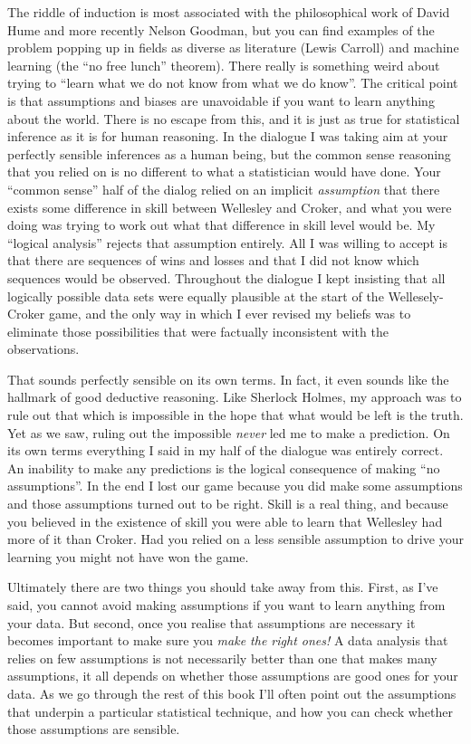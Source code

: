 The riddle of induction is most associated with the philosophical work of David Hume and more recently Nelson Goodman, but you can find examples of the problem popping up in fields as diverse as literature (Lewis Carroll) and machine learning (the ``no free lunch'' theorem). There really is something weird about trying to ``learn what we do not know from what we do know''. The critical point is that assumptions and biases are unavoidable if you want to learn anything about the world. There is no escape from this, and it is just as true for statistical inference as it is for human reasoning. In the dialogue I was taking aim at your perfectly sensible inferences as a human being, but the common sense reasoning that you relied on is no different to what a statistician would have done. Your ``common sense'' half of the dialog relied on an implicit {\it assumption} that there exists some difference in skill between Wellesley and Croker, and what you were doing was trying to work out what that difference in skill level would be. My ``logical analysis'' rejects that assumption entirely. All I was willing to accept is that there are sequences of wins and losses and that I did not know which sequences would be observed. Throughout the dialogue I kept insisting that all logically possible data sets were equally plausible at the start of the Wellesely-Croker game, and the only way in which I ever revised my beliefs was to eliminate those possibilities that were factually inconsistent with the observations. 

That sounds perfectly sensible on its own terms. In fact, it even sounds like the hallmark of good deductive reasoning. Like Sherlock Holmes, my approach was to rule out that which is impossible in the hope that what would be left is the truth. Yet as we saw, ruling out the impossible {\it never} led me to make a prediction. On its own terms everything I said in my half of the dialogue was entirely correct. An inability to make any predictions is the logical consequence of making ``no assumptions''. In the end I lost our game because you did make some assumptions and those assumptions turned out to be right. Skill is a real thing, and because you believed in the existence of skill you were able to learn that Wellesley had more of it than Croker. Had you relied on a less sensible assumption to drive your learning you might not have won the game. 

Ultimately there are two things you should take away from this. First, as I've said, you cannot avoid making assumptions if you want to learn anything from your data. But second, once you realise that assumptions are necessary it becomes important to make sure you {\it make the right ones!} A data analysis that relies on few assumptions is not necessarily better than one that makes many assumptions, it all depends on whether those assumptions are good ones for your data. As we go through the rest of this book I'll often point out the assumptions that underpin a particular statistical technique, and how you can check whether those assumptions are sensible. 
